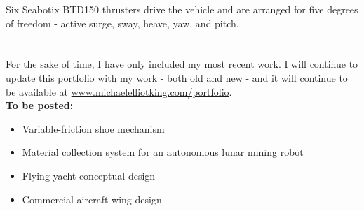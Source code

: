\documentclass[12pt, landscape]{article}
\begin{document}
Six Seabotix BTD150 thrusters drive the vehicle and are arranged for five degrees of freedom - active surge, sway, heave, yaw, and pitch.

\clearpage

\section{}
{\LARGE For the sake of time, I have only included my most recent work.  I will continue to update this portfolio with my work - both old and new - and it will continue to be available at \href{http://www/michaelelliotking.com/portfolio}{www.michaelelliotking.com/portfolio}.}\\[20pt]

\textbf{To be posted:}
\begin{itemize}
\item Variable-friction shoe mechanism
\item Material collection system for an autonomous lunar mining robot
\item Flying yacht conceptual design
\item Commercial aircraft wing design
\end{itemize}
\end{document}
